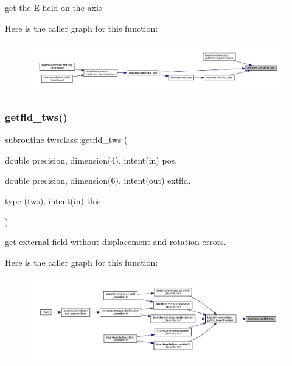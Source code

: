 get the E field on the axis 

Here is the caller graph for this function\+:\nopagebreak
\begin{figure}[H]
\begin{center}
\leavevmode
\includegraphics[width=350pt]{namespacetwsclass_a9c88e1753c1d3faff3af95cf8c071d4f_icgraph}
\end{center}
\end{figure}
\mbox{\label{namespacetwsclass_a30d73a1ffc1ce8ce728e8fdf7caa6002}} 
\subsubsection{\texorpdfstring{getfld\_tws()}{getfld\_tws()}}
{\footnotesize\ttfamily subroutine twsclass\+::getfld\+\_\+tws (\begin{DoxyParamCaption}\item[{double precision, dimension(4), intent(in)}]{pos,  }\item[{double precision, dimension(6), intent(out)}]{extfld,  }\item[{type (\mbox{\hyperlink{namespacetwsclass_structtwsclass_1_1tws}{tws}}), intent(in)}]{this }\end{DoxyParamCaption})}



get external field without displacement and rotation errors. 

Here is the caller graph for this function\+:\nopagebreak
\begin{figure}[H]
\begin{center}
\leavevmode
\includegraphics[width=350pt]{namespacetwsclass_a30d73a1ffc1ce8ce728e8fdf7caa6002_icgraph}
\end{center}
\end{figure}
\mbox{\label{namespacetwsclass_aaf9be4899e2515903618d2a1ab1dfbbc}} 
